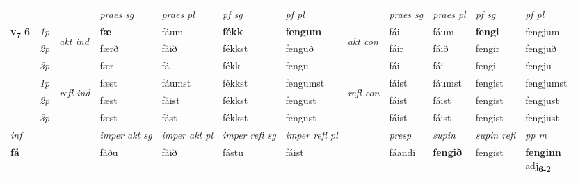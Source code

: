 \begin{longtable}[l]{X>{\footnotesize\itshape}llXXXXlXXXX}
\midrule
 & &   & \textit{praes sg}  & \textit{praes pl}    & \textit{ pf sg} & \textit{pf pl} & & \textit{praes sg}  & \textit{praes pl}    & \textit{pf sg} & \textit{pf pl }  \\ \cmidrule{4-7} \cmidrule{9-12}
 \multirow{2}{*}{{{\textbf{v{\textsubscript{7}}} \Large{\textbf{6}}}}}  & 1p & \multirow{3}{*}{\begin{turn}{90}\textit{akt ind}\end{turn}} & \textbf{fæ} & fáum & \textbf{fékk} & \textbf{fengum} & \multirow{3}{*}{\begin{turn}{90}\textit{akt con}\end{turn}} &fái & fáum & \textbf{fengi} & fengjum\\*
 & 2p &  &  færð  & fáið & fékkst & fenguð & & fáir & fáið & fengir & fengjuð \\*
 & 3p &  & fær & fá & fékk & fengu & & fái & fái& fengi & fengju \\*
\cmidrule{4-7} \cmidrule{9-12}
 & 1p & \multirow{3}{*}{\begin{turn}{90}\textit{refl ind}\end{turn}}  & fæst & fáumst & fékkst & fengumst & \multirow{3}{*}{\begin{turn}{90}\textit{refl con}\end{turn}}  &fáist & fáumst & fengist & fengjumst \\*
 & 2p &  & fæst & fáist & fékkst & fengust & &fáist & fáist & fengist & fengjust \\*
 & 3p  & & fæst & fást & fékkst & fengust & & fáist & fáist& fengist & fengjust \\*
\cmidrule{4-7} \cmidrule{9-12}

   {\textit{inf}} & &  & \textit{imper akt sg} & \textit{imper akt pl} & \textit{imper refl sg} & \textit{imper refl pl} && \textit{presp} & \textit{supin} & \textit{supin refl} & \textit{pp m} \\*
  {\textbf{fá}} & && fáðu  & fáið & fástu & fáist && fáandi &  \textbf{fengið} & fengist & \specialcell{\textbf{fenginn} \\ adj\textbf{\textsubscript{6-2}}} \\*

\midrule


\end{longtable}
